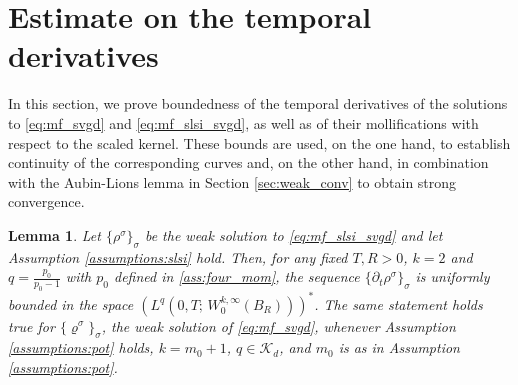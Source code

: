 \documentclass[reqno, 11pt]{amsart}
\numberwithin{equation}{section}
\newtheorem{lem}[thm]{Lemma}
\theoremstyle{definition}
\begin{document}
\section{Estimate on the temporal derivatives}

\label{subsec:dt_est}

In this section, we prove boundedness of the temporal derivatives of the solutions to \eqref{eq:mf_svgd} and \eqref{eq:mf_slsi_svgd}, as well as of their mollifications with respect to the scaled kernel. These bounds are used, on the one hand, to establish continuity of the corresponding curves and, on the other hand, in combination with the Aubin-Lions lemma in Section \ref{sec:weak_conv} to obtain strong convergence.

\begin{lem}
    \label{bnd:dt_rho}
    Let $\{\rho^\sigma\}_\sigma$ be the weak solution to \eqref{eq:mf_slsi_svgd} and let Assumption \ref{assumptions:slsi} hold. Then, for any fixed $T,R>0$, $k=2$ and $q=\frac{p_0}{p_0-1}$ with $p_0$ defined in \ref{ass:four_mom}, the sequence $\{\partial_t\rho^\sigma\}_\sigma$ is uniformly bounded in the space $(L^q(0,T;\, W_0^{k,\infty}(B_R)))^\ast$.
    The same statement holds true for $\{\varrho^\sigma\}_\sigma$, the weak solution of \eqref{eq:mf_svgd}, whenever Assumption \ref{assumptions:pot} holds, $k=m_0+1$, $q\in \mathcal{K}_d$, and $m_0$ is as in Assumption \ref{assumptions:pot}.
\end{lem}
\end{document}
